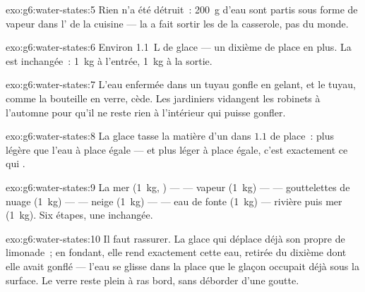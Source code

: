 \begin{solution}{exo:g6:water-states:5}
Rien n'a été détruit~: \qty{200}{g} d'eau sont partis sous forme de
vapeur dans l' de la cuisine --- la  a fait sortir les
 de la casserole, pas du monde.
\end{solution}

\begin{solution}{exo:g6:water-states:6}
Environ \qty{1.1}{L} de glace --- un dixième de place en plus. La
 est inchangée~: \qty{1}{kg} à l'entrée, \qty{1}{kg} à la
sortie.
\end{solution}

\begin{solution}{exo:g6:water-states:7}
L'eau enfermée dans un tuyau gonfle en gelant, et le tuyau, comme la
bouteille en verre, cède. Les jardiniers vidangent les robinets à
l'automne pour qu'il ne reste rien à l'intérieur qui puisse gonfler.
\end{solution}

\begin{solution}{exo:g6:water-states:8}
La glace tasse la matière d'un  dans $1.1$  de place~: plus
légère que l'eau à place égale --- et plus léger à place égale, c'est
exactement ce qui .
\end{solution}

\begin{solution}{exo:g6:water-states:9}
La mer (\qty{1}{kg}, ) ---  --- vapeur
(\qty{1}{kg}) ---  --- gouttelettes de nuage
(\qty{1}{kg}) ---  --- neige (\qty{1}{kg}) --- 
--- eau de fonte (\qty{1}{kg}) --- rivière puis mer (\qty{1}{kg}).
Six étapes, une  inchangée.
\end{solution}

\begin{solution}{exo:g6:water-states:10}
Il faut rassurer. La glace qui  déplace déjà son propre
\emph{} de limonade~; en fondant, elle rend exactement cette
eau, retirée du dixième dont elle avait gonflé --- l'eau se glisse
dans la place que le glaçon occupait déjà sous la surface. Le verre
reste plein à ras bord, sans déborder d'une goutte.
\end{solution}

